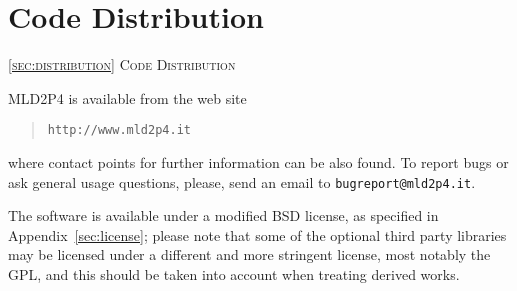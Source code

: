 \section{Code Distribution\label{sec:distribution}}
         {\textsc{\ref{sec:distribution} Code Distribution}}

\noindent
MLD2P4 is available from the web site 
\begin{quotation}
\texttt{http://www.mld2p4.it}
\end{quotation}
where contact points for further information can be also found.
To report bugs or ask general usage questions, please, send an email to
\texttt{bugreport@mld2p4.it}.


The software is available under a modified BSD license, as specified
in Appendix~\ref{sec:license}; please note that some of the optional
third party libraries may be licensed under a different and more
stringent license, most notably the GPL, and this should be taken into
account when treating derived works. 
